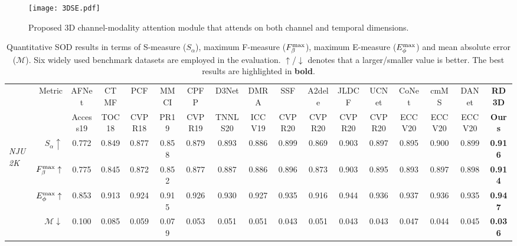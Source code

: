 \documentclass[letterpaper]{article}
\begin{document}
\begin{figure}
	\centering
	\texttt{[image: 3DSE.pdf]}\vspace{-0.3cm}
	\caption{\small Proposed 3D channel-modality attention module that attends on both channel and temporal dimensions.}\vspace{-0.3cm}
	\label{label2}
\end{figure}
\begin{table*}[t!]
	\centering
	\caption{\small Quantitative SOD results in terms of S-measure ($S_\alpha$), maximum F-measure ($F_\beta^{\rm max}$), maximum E-measure ($E_\phi^{\rm max}$) and mean absolute error ($\mathcal{M}$). Six widely used benchmark datasets are employed in the evaluation.
$\uparrow$/$\downarrow$ denotes that a larger/smaller value is better. The best results are highlighted in \textbf{bold}.}\vspace{-0.5cm}
	\label{table:QuantitativeResults}
	\vspace{8pt}
\scriptsize
\renewcommand{\arraystretch}{0.7}
	\renewcommand{\tabcolsep}{1.07mm}
	\begin{tabular}{lr|cccccccccccccc||c}
		\hline\toprule
		& \multirow{2}{*}{Metric}   & AFNet & CTMF & PCF & MMCI & CPFP & D3Net & DMRA  &SSF &A2dele  & JLDCF &UCNet &CoNet &cmMS  &DANet  & \textbf{RD3D} \\
		&   &\scriptsize Access19 &\scriptsize TOC18   &\scriptsize CVPR18 &\scriptsize PR19 &\scriptsize CVPR19 &\scriptsize TNNLS20 &\scriptsize ICCV19  &\scriptsize CVPR20 &\scriptsize CVPR20  &\scriptsize CVPR20 &\scriptsize CVPR20  &\scriptsize ECCV20  &\scriptsize ECCV20 &\scriptsize ECCV20 & \textbf{Ours} \\
		\hline
		\multirow{4}{*}{\begin{sideways}\textit{NJU2K}\end{sideways}}
& $S_{\alpha}\uparrow$  & 0.772 & 0.849 & 0.877 & 0.858  & 0.879 & 0.893 & 0.886  & 0.899 &0.869 & 0.903 &0.897 &0.895 &0.900  &0.899  & \bf{0.916}\\
		& $F_{\beta}^{\rm max}\uparrow$     & 0.775 & 0.845 & 0.872 & 0.852  & 0.877 & 0.887 & 0.886 &0.896 &0.873 &0.903 &0.895 &0.893 &0.897 & 0.898 & \bf{0.914} \\
		& $E_{\phi}^{\rm max}\uparrow$    & 0.853 & 0.913 & 0.924 & 0.915  & 0.926 & 0.930 & 0.927 &0.935 &0.916 &0.944 &0.936 &0.937 &0.936  &0.935  &\bf{0.947}  \\
		& $\mathcal{M}\downarrow$ & 0.100 & 0.085 & 0.059 & 0.079  & 0.053 & 0.051 & 0.051 &0.043   &0.051 &0.043  &0.043 &0.047 &0.044 &0.045  &\bf{0.036} \\

\end{tabular}
\end{table*}
\end{document}
